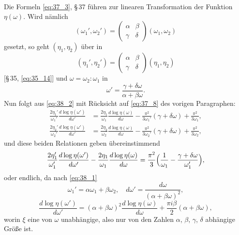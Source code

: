 \documentclass[12pt,a4paper]{article}
\begin{document}
Die Formeln \eqref{eq:37_3}, \S\,37 f\"uhren zur linearen Transformation der Funktion $\eta(\omega)$. Wird n\"amlich
\begin{equation}\label{eq:38_1}
(\omega_1',\omega_2') = \begin{pmatrix} \alpha & \beta \\ \gamma & \delta \end{pmatrix}(\omega_1,\omega_2)
\end{equation}
gesetzt, so geht $(\eta_1,\eta_2)$ \"uber in
\begin{equation}\label{eq:38_2}
(\eta_1',\eta_2') = \begin{pmatrix} \alpha & \beta \\ \gamma & \delta \end{pmatrix}(\eta_1,\eta_2)
\end{equation}
[\S\,35, \eqref{eq:35_14}] und $\omega = \omega_2:\omega_1$ in
\begin{equation}\label{eq:38_3}
\omega' = \frac{\gamma+\delta\omega}{\alpha+\beta\omega}.
\end{equation}
Nun folgt aus \eqref{eq:38_2} mit R\"ucksicht auf \eqref{eq:37_8} des vorigen Paragraphen:
\begin{align*}
\frac{2\eta_1'}{\omega_1'}\frac{d\log\eta(\omega')}{d\omega'} &= \frac{2\eta_1}{\omega_1}\frac{d\log\eta(\omega)}{d\omega} - \frac{\pi^2}{3\omega_1'}(\gamma+\delta\omega) + \frac{\pi^2}{3\omega_1},\\
\frac{2\eta_2'}{\omega_2'}\frac{d\log\eta(\omega')}{d\omega'} &= \frac{2\eta_2}{\omega_2}\frac{d\log\eta(\omega)}{d\omega} - \frac{\pi^2}{3\omega_2'}(\gamma+\delta\omega) + \frac{\pi^2}{3\omega_2},
\end{align*}
und diese beiden Relationen geben \"ubereinstimmend
\[
\frac{2\eta_1'}{\omega_1'}\frac{d\log\eta(\omega')}{d\omega'} - \frac{2\eta_1}{\omega_1}\frac{d\log\eta(\omega)}{d\omega}
= \frac{\pi^2}{3}\Bigl(\frac{1}{\omega_1} - \frac{\gamma+\delta\omega}{\omega_1'}\Bigr),
\]
oder endlich, da nach \eqref{eq:38_1}
\[
\omega_1' = \alpha\omega_1 + \beta\omega_2,\quad d\omega' = \frac{d\omega}{(\alpha+\beta\omega)^2},
\]
\begin{equation}\label{eq:38_4}
\frac{d\log\eta(\omega')}{d\omega'} = (\alpha+\beta\omega)^2\frac{d\log\eta(\omega)}{d\omega} + \frac{\pi i\beta}{2}(\alpha+\beta\omega),
\end{equation}
worin $\xi$ eine von $\omega$ unabh\"angige, also nur von den Zahlen $\alpha$, $\beta$, $\gamma$, $\delta$ abh\"angige Gr\"o\ss e ist.
\end{document}
